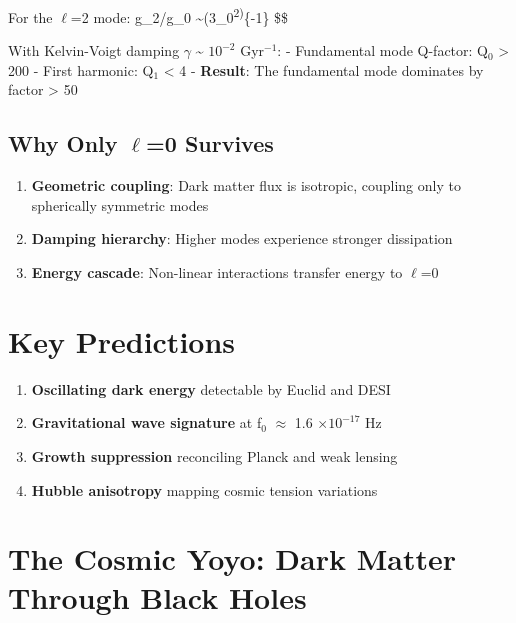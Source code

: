 \documentclass[
  11pt,
]{report}
\providecommand{\tightlist}{%
  \setlength{\itemsep}{0pt}\setlength{\parskip}{0pt}}
\begin{document}
For the \(\ell\)=2 mode: g\_2/g\_0
\sim (3\omega\_0\textsuperscript{2)}\{-1\} \$\$

With Kelvin-Voigt damping \(\gamma\) \textasciitilde{} \(10^{-2}\)
Gyr\(^{-1}\): - Fundamental mode Q-factor: Q\(_0\) \textgreater{} 200 -
First harmonic: Q\(_1\) \textless{} 4 - \textbf{Result}: The fundamental
mode dominates by factor \textgreater{} 50

\subsection{\texorpdfstring{Why Only \(\ell\)=0
Survives}{Why Only \textbackslash ell=0 Survives}}\label{why-only-ell0-survives}

\begin{enumerate}
\def\labelenumi{\arabic{enumi}.}
\tightlist
\item
  \textbf{Geometric coupling}: Dark matter flux is isotropic, coupling
  only to spherically symmetric modes
\item
  \textbf{Damping hierarchy}: Higher modes experience stronger
  dissipation
\item
  \textbf{Energy cascade}: Non-linear interactions transfer energy to
  \(\ell\)=0
\end{enumerate}

\section{Key Predictions}\label{key-predictions}

\begin{enumerate}
\def\labelenumi{\arabic{enumi}.}
\tightlist
\item
  \textbf{Oscillating dark energy} detectable by Euclid and DESI
\item
  \textbf{Gravitational wave signature} at f\(_0\) \(\approx\) 1.6
  \(\times 10^{-17}\) Hz
\item
  \textbf{Growth suppression} reconciling Planck and weak lensing
\item
  \textbf{Hubble anisotropy} mapping cosmic tension variations
\end{enumerate}

\section{The Cosmic Yoyo: Dark Matter Through Black
Holes}\label{the-cosmic-yoyo-dark-matter-through-black-holes}
\end{document}
